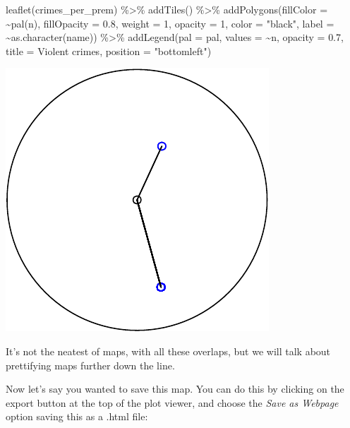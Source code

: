 \documentclass[
]{book}
\newenvironment{Shaded}{\begin{snugshade}}{\end{snugshade}}
\newcommand{\AttributeTok}[1]{\textcolor[rgb]{0.77,0.63,0.00}{#1}}
\newcommand{\DecValTok}[1]{\textcolor[rgb]{0.00,0.00,0.81}{#1}}
\newcommand{\FloatTok}[1]{\textcolor[rgb]{0.00,0.00,0.81}{#1}}
\newcommand{\FunctionTok}[1]{\textcolor[rgb]{0.00,0.00,0.00}{#1}}
\newcommand{\NormalTok}[1]{#1}
\newcommand{\SpecialCharTok}[1]{\textcolor[rgb]{0.00,0.00,0.00}{#1}}
\newcommand{\StringTok}[1]{\textcolor[rgb]{0.31,0.60,0.02}{#1}}
\begin{document}
\begin{Shaded}
\begin{Highlighting}[]
\FunctionTok{leaflet}\NormalTok{(crimes\_per\_prem) }\SpecialCharTok{\%\textgreater{}\%} 
  \FunctionTok{addTiles}\NormalTok{() }\SpecialCharTok{\%\textgreater{}\%} 
  \FunctionTok{addPolygons}\NormalTok{(}\AttributeTok{fillColor =} \SpecialCharTok{\textasciitilde{}}\FunctionTok{pal}\NormalTok{(n), }\AttributeTok{fillOpacity =} \FloatTok{0.8}\NormalTok{,}
              \AttributeTok{weight =} \DecValTok{1}\NormalTok{, }\AttributeTok{opacity =} \DecValTok{1}\NormalTok{, }\AttributeTok{color =} \StringTok{"black"}\NormalTok{,}
              \AttributeTok{label =} \SpecialCharTok{\textasciitilde{}}\FunctionTok{as.character}\NormalTok{(name)) }\SpecialCharTok{\%\textgreater{}\%} 
  \FunctionTok{addLegend}\NormalTok{(}\AttributeTok{pal =}\NormalTok{ pal, }\AttributeTok{values =} \SpecialCharTok{\textasciitilde{}}\NormalTok{n, }\AttributeTok{opacity =} \FloatTok{0.7}\NormalTok{, }
            \AttributeTok{title =} \StringTok{\textquotesingle{}Violent crimes\textquotesingle{}}\NormalTok{, }\AttributeTok{position =} \StringTok{"bottomleft"}\NormalTok{) }
\end{Highlighting}
\end{Shaded}

\includegraphics{crime_mapping_files/figure-latex/unnamed-chunk-44-1.pdf}

It's not the neatest of maps, with all these overlaps, but we will talk about prettifying maps further down the line.

Now let's say you wanted to save this map. You can do this by clicking on the export button at the top of the plot viewer, and choose the \emph{Save as Webpage} option saving this as a .html file:
\end{document}
